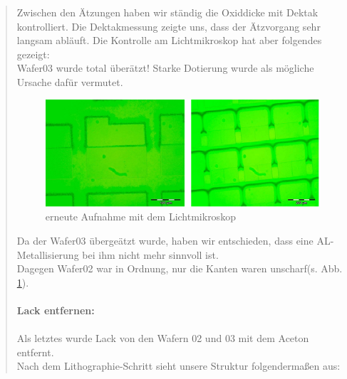 \begin{quote}
    		\vspace{2em}

			Zwischen den Ätzungen haben wir ständig die Oxiddicke mit Dektak
			kontrolliert. Die Dektakmessung zeigte uns, dass der Ätzvorgang sehr
			langsam abläuft. Die Kontrolle am Lichtmikroskop hat aber folgendes
			gezeigt:\\
			Wafer03 wurde total überätzt! Starke Dotierung wurde als mögliche
			Ursache dafür vermutet.

			\vspace{2em}

    		\begin{figure}[H]
				\hspace{-0.7 cm}
                  \includegraphics[scale=1, trim = 0cm 0cm 0cm 0cm,clip]
                	{./HerstellungBilder/LichtmikroskopbilderW23.png}
                  \caption{erneute Aufnahme mit dem Lichtmikroskop}
                \label{fig:ernLichtmi}
            \end{figure}

    		\vspace{2em}


    		Da der Wafer03 übergeätzt wurde, haben wir entschieden, dass
    		eine AL-Metallisierung bei ihm nicht mehr sinnvoll ist.\\
			Dagegen Wafer02 war in Ordnung, nur die Kanten waren unscharf(s.
			Abb. \ref{fig:ernLichtmi}).\\
			\\
			\textbf{Lack entfernen:}\\
			\\
			Als letztes wurde Lack von den Wafern 02 und 03 mit dem Aceton
			entfernt.\\
			Nach dem Lithographie-Schritt sieht unsere Struktur folgendermaßen
			aus:

    		\vspace{2em}


\end{quote}
